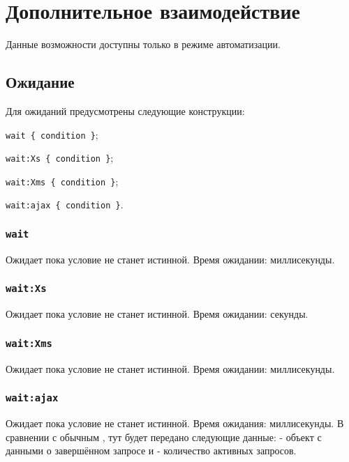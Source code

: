 \section{Дополнительное взаимодействие}

Данные возможности доступны только в режиме автоматизации.

\subsection{Ожидание}

Для ожиданий предусмотрены следующие конструкции:
\begin{icItems}
	\item \lstinline|wait { condition }|;
	\item \lstinline|wait:Xs { condition }|;
	\item \lstinline|wait:Xms { condition }|;
	\item \lstinline|wait:ajax { condition }|.
\end{icItems}

\subsubsection{\lstinline|wait|}

Ожидает пока условие не станет истинной. Время ожидании:  миллисекунды. 

\subsubsection{\lstinline|wait:Xs|}

Ожидает пока условие не станет истинной. Время ожидании:  секунды. 

\subsubsection{\lstinline|wait:Xms|}

Ожидает пока условие не станет истинной. Время ожидании:  миллисекунды. 

\subsubsection{\lstinline|wait:ajax|}

Ожидает пока условие не станет истинной. Время ожидания:  миллисекунды. В сравнении с обычным , тут будет передано следующие данные:  - объект с данными о завершённом запросе и  - количество активных запросов.

